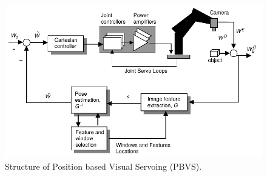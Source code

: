 \documentclass[a4paper,12pt]{article}
\begin{document}
\begin{figure}[tb!]
         \centering
         \includegraphics[width=13cm]{../images/PBVS_loop.png}
         \caption{Structure of Position based Visual Servoing (PBVS).}
        \label{fig:fig2}
\end{figure}
\end{document}
